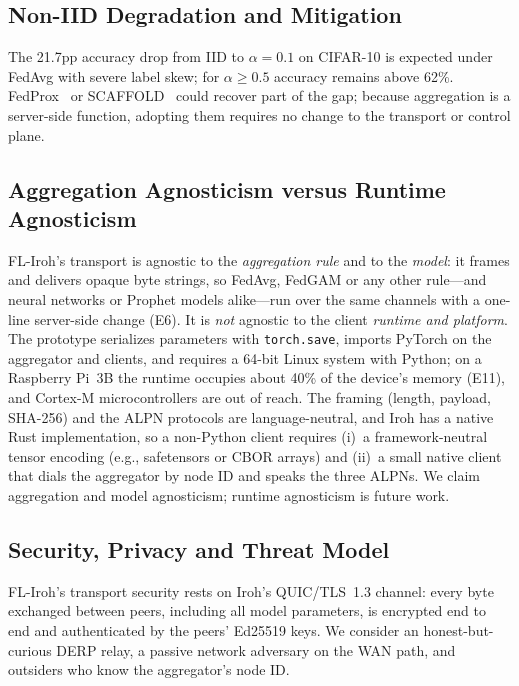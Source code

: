 \subsection{Non-IID Degradation and Mitigation}

The 21.7pp accuracy drop from IID to $\alpha{=}0.1$ on CIFAR-10 is expected under FedAvg with severe label skew; for $\alpha{\geq}0.5$ accuracy remains above 62\%. FedProx~\cite{fedprox2020} or SCAFFOLD~\cite{scaffold2020} could recover part of the gap; because aggregation is a server-side function, adopting them requires no change to the transport or control plane.

\subsection{Aggregation Agnosticism versus Runtime Agnosticism}
\label{sec:agnostic}

FL-Iroh's transport is agnostic to the \emph{aggregation rule} and to the \emph{model}: it frames and delivers opaque byte strings, so FedAvg, FedGAM or any other rule---and neural networks or Prophet models alike---run over the same channels with a one-line server-side change (E6). It is \emph{not} agnostic to the client \emph{runtime and platform}. The prototype serializes parameters with \texttt{torch.save}, imports PyTorch on the aggregator and clients, and requires a 64-bit Linux system with Python; on a Raspberry Pi~3B the runtime occupies about 40\% of the device's memory (E11), and Cortex-M microcontrollers are out of reach. The framing (length, payload, SHA-256) and the ALPN protocols are language-neutral, and Iroh has a native Rust implementation, so a non-Python client requires (i)~a framework-neutral tensor encoding (e.g., safetensors or CBOR arrays) and (ii)~a small native client that dials the aggregator by node ID and speaks the three ALPNs. We claim aggregation and model agnosticism; runtime agnosticism is future work.

\subsection{Security, Privacy and Threat Model}
\label{sec:threat}

FL-Iroh's transport security rests on Iroh's QUIC/TLS~1.3 channel: every byte exchanged between peers, including all model parameters, is encrypted end to end and authenticated by the peers' Ed25519 keys. We consider an honest-but-curious DERP relay, a passive network adversary on the WAN path, and outsiders who know the aggregator's node ID.

